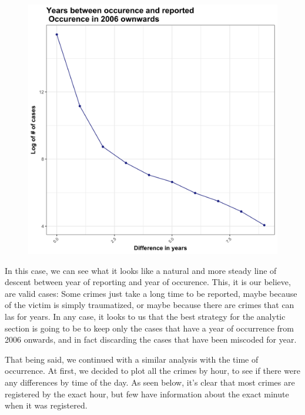\documentclass{article}
\begin{document}
\begin{figure}[H]
\centering
\includegraphics[scale=0.14]{11_LogDiffYears_2006.png}
\end{figure}

In this case, we can see what it looks like a natural and more steady line of descent between year of reporting and year of occurence. This, it is our believe, are valid cases: Some crimes just take a long time to be reported, maybe because of the victim is simply traumatized, or maybe because there are crimes that can las for years. In any case, it looks to us that the best strategy for the analytic section is going to be to keep only the cases that have a year of occurrence from 2006 onwards, and in fact discarding the cases that have been miscoded for year. 

That being said, we continued with a similar analysis with the time of occurrence. At first, we decided to plot all the crimes by hour, to see if there were any differences by time of the day. As seen below, it's clear that most crimes are registered by the exact hour, but few have information about the exact minute when it was registered. 
\end{document}
